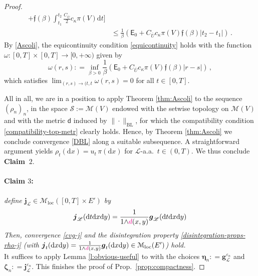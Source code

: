 \documentclass[11pt,reqno]{amsart}
\numberwithin{equation}{section}
\newcommand{\calM}{\mathcal{M}}
\newcommand{\scrL}{\mathscr{L}}
\newcommand{\eps}{\varepsilon}
\newcommand{\dd}{\mathrm{d}}
\theoremstyle{definition}
\newcommand{\ep}{\varepsilon}
\let\eps\ep
\def\dd{\mathrm{d}}
\newcommand{\Lebone}{\scrL}
\newcommand{\bj}{{\boldsymbol j}}
\newcommand{\bg}{{\boldsymbol{g}}}
\newcommand{\Ed}{{E'}}
\newcommand{\Mloc}{\mathcal{M}_{\mathrm{loc}}}
\newcommand{\ej}{\eps_n}
\newcommand{\psih}{\mathfrak{f}}%
\newcommand{\nbl}[1]{\|#1\|_{\mathrm{BL}} }
\newcommand{\zzeta}{\boldsymbol \zeta}
\newcommand{\eeta}{\boldsymbol \eta}
\newcommand{\RCR}{\color{magenta}}
\newcommand{\RNEW}{\color{black}} %
\newcommand{\TODOR}[1]{\todo[inline, color=magenta!20]{#1}}
\newcommand{\EEE}{\color{black}}
\newcommand{\dpi}{{\color{magenta} d}}
\numberwithin{equation}{section}
\begin{document}
\begin{proof}
\begin{equation}
\begin{aligned}
+ \psih(\beta) \int_{t_1}^{t_2}  \frac{C_{\overline{U}}}2 c_\kappa \pi(V)  \dd t \Big]
\\
& 
\leq \frac1\beta (\mathsf{E}_0 +   C_{\overline{U}} c_\kappa \pi(V) \psih(\beta)|t_2{-}t_1| )\,.
\end{aligned}
  \end{equation}
  By \eqref{Ascoli}, the equicontinuity  condition \eqref{equicontinuity} holds  with 
the function $\omega: [0,T]{\times}[0,T]\to [0,+\infty)$ given by \EEE
\[
\omega(r,s): = \inf_{\beta>0} \frac1\beta (\mathsf{E}_0 +   C_{\overline{U}} c_\kappa \pi(V) \psih(\beta)|r{-}s| )\,,
\]
which 
satisfies $\lim_{(r,s)\to (t,t} \omega(r,s)=0$ for all $t\in[0,T]$.
\par
\RNEW All in all,
we are in a position to apply Theorem \ref{thm:Ascoli} to the sequence $(\rho_n)_n$, in the space $\mathscr{S} :=\calM(V) $ endowed with the 
\RCR setwise topology on 
 $\calM(V)$  \EEE
 and with the metric
$\mathsf{d}$ induced by $\nbl{\cdot}$, for which the compatibility condition  \eqref{compatibility-top-metr} clearly holds.
 Hence, by 
\RNEW Theorem \ref{thm:Ascoli} we  conclude  convergence \eqref{DBL} along a suitable subsequence. 
 A straightforward argument yields   $ \rho_t(\dd x) = u_t\,   \pi(\dd x) $ for $\Lebone$-a.a.\ $t\in (0,T)$.  We thus \EEE
conclude \textbf{Claim~$2$}.
\medskip

\paragraph{\bf Claim $3$:} {\sl define $\bj_{\Lebone}\in \Mloc([0,T]{\times}\Ed)$ by 
\[
\bj_{\Lebone}(\dd t \dd x \dd y) = \frac1{1{\wedge}\dpi(x,y)} \bg_{\Lebone}( \dd t \dd x \dd y)
\]
 Then, convergence \eqref{cvg-j} \RNEW and the disintegration property \eqref{disintegration-props-rho-j} (with $\bj_t (\dd x \dd y)=  \frac1{1{\wedge}\dpi(x,y)} \bg_t(\dd x \dd y) \in \Mloc(\Ed)$) hold.}
\\
\RNEW It suffices to apply Lemma \ref{l:obvious-useful} to with the choices 
$\eeta_n: = \bg_{\Lebone}^{\ej}$ and 
$\zzeta_n: = \bj_{\Lebone}^{\ej}$. \EEE
\RNEW This finishes the proof of Prop.\ \ref{prop:compactness}. 
\end{proof}
\end{document}
